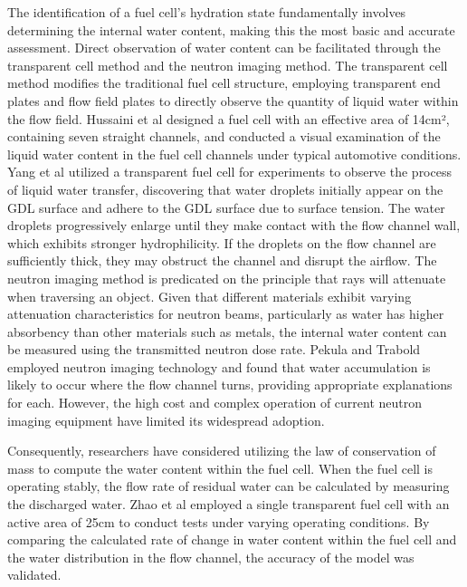 The identification of a fuel cell's hydration state fundamentally involves determining the internal water content, making this the most basic and accurate assessment. Direct observation of water content can be facilitated through the transparent cell method and the neutron imaging method. The transparent cell method modifies the traditional fuel cell structure, employing transparent end plates and flow field plates to directly observe the quantity of liquid water within the flow field\cite{leeVisualizationFloodingSingle2012}. Hussaini et al\cite{hussainiVisualizationQuantificationCathode2009} designed a fuel cell with an effective area of 14cm², containing seven straight channels, and conducted a visual examination of the liquid water content in the fuel cell channels under typical automotive conditions. Yang et al\cite{yangVisualizationLiquidWater2004} utilized a transparent fuel cell for experiments to observe the process of liquid water transfer, discovering that water droplets initially appear on the GDL surface and adhere to the GDL surface due to surface tension. The water droplets progressively enlarge until they make contact with the flow channel wall, which exhibits stronger hydrophilicity. If the droplets on the flow channel are sufficiently thick, they may obstruct the channel and disrupt the airflow. The neutron imaging method is predicated on the principle that rays will attenuate when traversing an object. Given that different materials exhibit varying attenuation characteristics for neutron beams, particularly as water has higher absorbency than other materials such as metals, the internal water content can be measured using the transmitted neutron dose rate. Pekula\cite{pekulaStudyWaterDistribution2005} and Trabold\cite{traboldSituInvestigationWater2006} employed neutron imaging technology and found that water accumulation is likely to occur where the flow channel turns, providing appropriate explanations for each. However, the high cost and complex operation of current neutron imaging equipment have limited its widespread adoption.
\par
Consequently, researchers have considered utilizing the law of conservation of mass to compute the water content within the fuel cell. When the fuel cell is operating stably,
the flow rate of residual water can be calculated by measuring the discharged water. Zhao et al\cite{zhaoStudyWaterTransport2021} employed a single 
transparent fuel cell with an active area of 25cm to conduct tests under varying operating conditions. 
By comparing the calculated rate of change in water content within the fuel cell and the water distribution in the flow channel, the accuracy of the model was validated.

